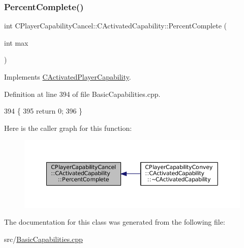 \hypertarget{classCPlayerCapabilityCancel_1_1CActivatedCapability_a69d2fec27186cba11ab545560e7bf45d}{}\label{classCPlayerCapabilityCancel_1_1CActivatedCapability_a69d2fec27186cba11ab545560e7bf45d} 
\subsubsection{\texorpdfstring{Percent\+Complete()}{PercentComplete()}}
{\footnotesize\ttfamily int C\+Player\+Capability\+Cancel\+::\+C\+Activated\+Capability\+::\+Percent\+Complete (\begin{DoxyParamCaption}\item[{int}]{max }\end{DoxyParamCaption})\hspace{0.3cm}{\ttfamily [virtual]}}



Implements \hyperlink{classCActivatedPlayerCapability_a405dc6076058006a4f801727de4cfe4d}{C\+Activated\+Player\+Capability}.



Definition at line 394 of file Basic\+Capabilities.\+cpp.


\begin{DoxyCode}
394                                                                        \{
395     \textcolor{keywordflow}{return} 0;
396 \}
\end{DoxyCode}
Here is the caller graph for this function\+:\nopagebreak
\begin{figure}[H]
\begin{center}
\leavevmode
\includegraphics[width=350pt]{classCPlayerCapabilityCancel_1_1CActivatedCapability_a69d2fec27186cba11ab545560e7bf45d_icgraph}
\end{center}
\end{figure}


The documentation for this class was generated from the following file\+:\begin{DoxyCompactItemize}
\item 
src/\hyperlink{BasicCapabilities_8cpp}{Basic\+Capabilities.\+cpp}\end{DoxyCompactItemize}
